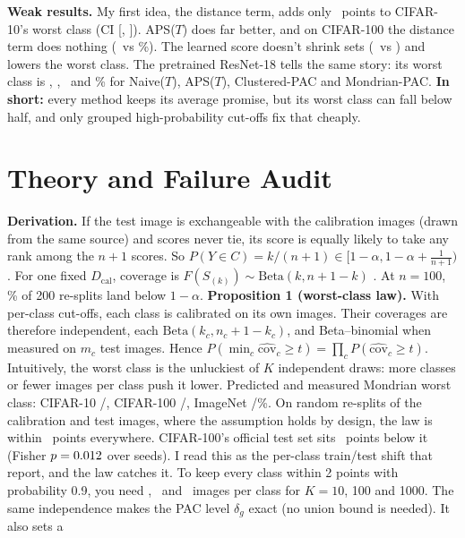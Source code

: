 \documentclass{article}
\begin{document}
\textbf{Weak results.} My first idea, the distance term, adds only \BsCTenDistVsNaiveW\ points to CIFAR-10's worst class (CI
[\BsCTenDistVsNaiveWLo, \BsCTenDistVsNaiveWHi]). APS($T$) does far better, and on CIFAR-100 the distance term does nothing
(\WorstCHunDist\ vs \WorstCHunNaiveT\%). The learned score doesn't shrink sets (\SizeCTenLearned\ vs \SizeCTenNaiveT) and lowers the
worst class. The pretrained ResNet-18 tells the same story: its worst class is \WorstCTenRNaiveT, \WorstCTenRAPST, \WorstCTenRClusPAC\
and \WorstCTenRMondPAC\% for Naive($T$), APS($T$), Clustered-PAC and Mondrian-PAC.
\textbf{In short:} every method keeps its average promise, but its worst class can fall below half, and only grouped
high-probability cut-offs fix that cheaply.

\section{Theory and Failure Audit}\label{sec:depth}
\textbf{Derivation.} If the test image is exchangeable with the calibration images (drawn from the same source) and scores never tie,
its score is equally likely to take any rank among the $n{+}1$ scores. So $P(Y\in C)=k/(n{+}1)\in[1-\alpha,1-\alpha+\tfrac1{n+1})$. For one fixed $D_\text{cal}$, coverage is
$F(S_{(k)})\sim\mathrm{Beta}(k,n{+}1{-}k)$ \citep{angelopoulos2021gentle}. At $n=100$, \BelowHundred\% of 200 re-splits land below
$1-\alpha$.
\textbf{Proposition 1 (worst-class law).} With per-class cut-offs, each class is calibrated on its own images. Their coverages
are therefore independent, each $\mathrm{Beta}(k_c,n_c{+}1{-}k_c)$, and Beta--binomial when measured on $m_c$ test images. Hence
$P(\min_c\widehat{\mathrm{cov}}_c\ge t)=\prod_cP(\widehat{\mathrm{cov}}_c\ge t)$. Intuitively, the worst class is the unluckiest of $K$
independent draws: more classes or fewer images per class push it lower. Predicted and measured Mondrian worst class: CIFAR-10
\PredCTenMond/\MeasCTenMond, CIFAR-100 \PredCHunMond/\MeasCHunMond, ImageNet \PredINetMond/\MeasINetMond\%. On random re-splits of the calibration
and test images, where the assumption holds by design, the law is within \NsMaxErr\ points everywhere. CIFAR-100's official test set sits \MissPtsCHun\
points below it (Fisher $p=0.012$ over seeds). I read this as the per-class train/test shift that \citet{recht2018cifar} report,
and the law catches it. To keep every class within 2 points with probability 0.9, you need \NeedTen, \NeedHun\ and \NeedThou\ images
per class for $K=10$, 100 and 1000. The same independence makes the PAC level $\delta_g$ exact (no union bound is needed). It also sets a
\end{document}
